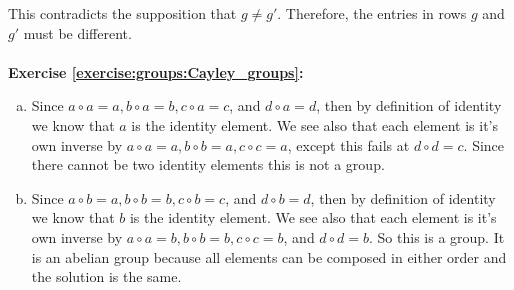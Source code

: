 \noindent
This contradicts the supposition that $g \neq g'$.  Therefore, the entries in rows $g$ and $g'$ must be different.\\
\\

\noindent\textbf{Exercise \ref{exercise:groups:Cayley_groups}:}
\begin{enumerate}[(a)]

\item
Since $a \circ a = a, b \circ a = b, c \circ a = c$, and $d \circ a = d$, then by definition of identity we know that $a$ is the identity element.  We see also that each element is it's own inverse by $a \circ a = a, b \circ b = a, c \circ c = a$, except this fails at $d \circ d = c$.  Since there cannot be two identity elements this is not a group.

\item
Since $a \circ b = a, b \circ b = b, c \circ b = c$, and $d \circ b = d$, then by definition of identity we know that $b$ is the identity element.  We see also that each element is it's own inverse by $a \circ a = b, b \circ b = b, c \circ c = b$, and $d \circ d = b$.  So this is a group.  It is an abelian group because all elements can be composed in either order and the solution is the same.


\end{enumerate}
